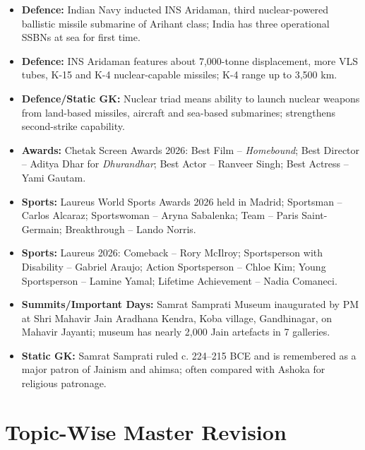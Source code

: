 \documentclass[10pt,a4paper]{article}
\begin{document}
\begin{itemize}
    \item \textbf{Defence:} Indian Navy inducted INS Aridaman, third nuclear-powered ballistic missile submarine of Arihant class; India has three operational SSBNs at sea for first time.
    \item \textbf{Defence:} INS Aridaman features about 7,000-tonne displacement, more VLS tubes, K-15 and K-4 nuclear-capable missiles; K-4 range up to 3,500 km.
    \item \textbf{Defence/Static GK:} Nuclear triad means ability to launch nuclear weapons from land-based missiles, aircraft and sea-based submarines; strengthens second-strike capability.
    \item \textbf{Awards:} Chetak Screen Awards 2026: Best Film -- \textit{Homebound}; Best Director -- Aditya Dhar for \textit{Dhurandhar}; Best Actor -- Ranveer Singh; Best Actress -- Yami Gautam.
    \item \textbf{Sports:} Laureus World Sports Awards 2026 held in Madrid; Sportsman -- Carlos Alcaraz; Sportswoman -- Aryna Sabalenka; Team -- Paris Saint-Germain; Breakthrough -- Lando Norris.
    \item \textbf{Sports:} Laureus 2026: Comeback -- Rory McIlroy; Sportsperson with Disability -- Gabriel Araujo; Action Sportsperson -- Chloe Kim; Young Sportsperson -- Lamine Yamal; Lifetime Achievement -- Nadia Comaneci.
    \item \textbf{Summits/Important Days:} Samrat Samprati Museum inaugurated by PM at Shri Mahavir Jain Aradhana Kendra, Koba village, Gandhinagar, on Mahavir Jayanti; museum has nearly 2,000 Jain artefacts in 7 galleries.
    \item \textbf{Static GK:} Samrat Samprati ruled c. 224--215 BCE and is remembered as a major patron of Jainism and ahimsa; often compared with Ashoka for religious patronage.
\end{itemize}

\section{Topic-Wise Master Revision}

\end{document}

